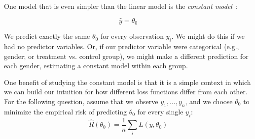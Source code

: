 \documentclass[addpoints, 12pt]{exam}
\theoremstyle{definition}
\newtheorem*{answer}{Answer}
\begin{document}
\begin{questions}

\vspace{-1em}

\question[10] One model that is even simpler than the linear model is the {\em constant model~}:

 $$\hat{y} = \theta_0$$

We predict exactly the same $\theta_0$ for every observation $y_i$. We might do this if we had no predictor variables. Or, if our predictor variable were categorical (e.g., gender; or treatment vs. control group), we might make a different prediction for each gender, estimating a constant model within each group.

One benefit of studying the constant model is that it is a simple context in which we can build our intuition for how different loss functions differ from each other. For the following question, assume that we observe $y_1,\ldots,y_n$, and we choose $\theta_0$ to minimize the empirical risk of predicting $\theta_0$ for every single $y_i$:
\[
\hat{R}(\theta_0) = \frac{1}{n} \sum_i L(y, \theta_0)
\]

\end{questions}
\end{document}
